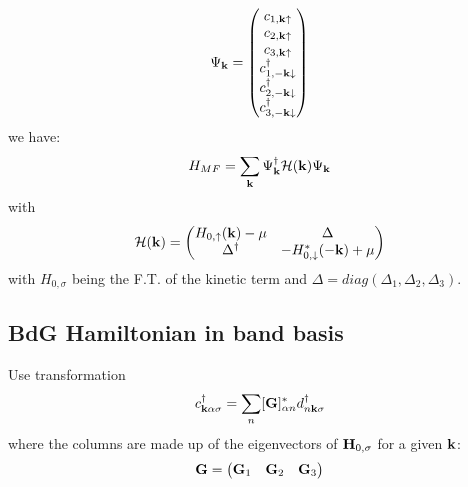 \documentclass[../main.tex]{subfiles}
\begin{document}
\begin{equation}
	\Psi_{\bm{\mathrm{k}}} =
	\begin{pmatrix}
		c_{1, \bm{\mathrm{k}} \uparrow} \\
		c_{2, \bm{\mathrm{k}} \uparrow} \\
		c_{3, \bm{\mathrm{k}} \uparrow} \\
		c_{1, -\bm{\mathrm{k}} \downarrow}^{\dagger} \\
		c_{2, -\bm{\mathrm{k}} \downarrow}^{\dagger} \\
		c_{3, -\bm{\mathrm{k}} \downarrow}^{\dagger} \\
	\end{pmatrix}
\end{equation}
we have:
\begin{equation}
	H_{MF} = \sum_{\bm{\mathrm{k}}} \Psi_{\bm{\mathrm{k}}}^{\dagger} \mathcal{H} (\bm{\mathrm{k}}) \Psi_{\bm{\mathrm{k}}}
\end{equation}
with
\begin{equation}
	\mathcal{H} (\bm{\mathrm{k}}) =
	\begin{pmatrix}
		H_{0, \uparrow} (\bm{\mathrm{k}}) - \mu & \Delta \\
		\Delta^{\dagger} & - H_{0, \downarrow}^* (-\bm{\mathrm{k}}) + \mu
	\end{pmatrix}
\end{equation}
with \(H_{0, \sigma}\) being the F.T. of the kinetic term and \(\Delta = diag(\Delta_1, \Delta_2, \Delta_3)\).


\subsection{BdG Hamiltonian in band basis}

Use transformation
\begin{equation}
	c_{\bm{\mathrm{k}} \alpha \sigma}^{\dagger} = \sum_{n} [\textbf{G}]_{\alpha n}^* d_{n \bm{\mathrm{k}} \sigma}^{\dagger}
\end{equation}
where the columns are made up of the eigenvectors of \(\textbf{H}_{0, \sigma}\) for a given \(\bm{\mathrm{k}}\):
\begin{equation}
	\textbf{G} = 
	\begin{pmatrix}
		\bm{\mathrm{G}}_1 & \bm{\mathrm{G}}_2 & \bm{\mathrm{G}}_3
	\end{pmatrix}
\end{equation}
\end{document}
